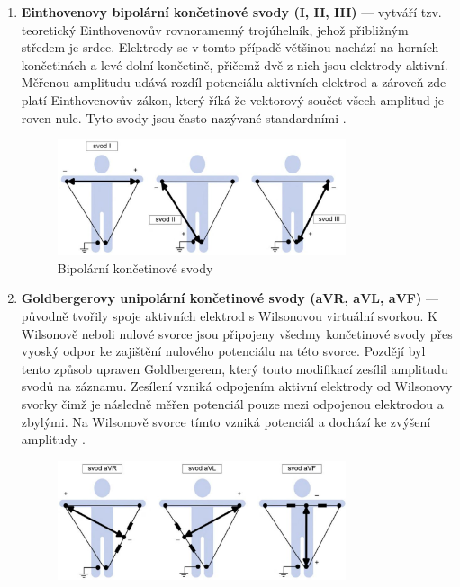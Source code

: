 \begin{enumerate}
	\item \textbf{Einthovenovy bipolární končetinové svody (I, II, III)} ---
	      vytváří tzv. teoretický Einthovenovův rovnoramenný trojúhelník, jehož
	      přibližným středem je srdce. Elektrody se v tomto případě většinou
	      nachází na horních končetinách a levé dolní končetině, přičemž dvě z
	      nich jsou elektrody aktivní. Měřenou amplitudu udává rozdíl
	      potenciálu aktivních elektrod a zároveň zde platí Einthovenovův
	      zákon, který říká že vektorový součet všech amplitud je roven nule.
	      Tyto svody jsou často nazývané standardními \cite{Kittnar2020}.
	      \begin{figure}[h]
		      \begin{center}
			      \includegraphics[width=0.8\textwidth]{../assets/anatomy/bipolar}
			      \caption{Bipolární končetinové svody \cite{Kittnar2020}}
			      \label{fig:bipolar}
		      \end{center}
	      \end{figure}
	\item \textbf{Goldbergerovy unipolární končetinové svody (aVR, aVL, aVF)}
	      --- původně tvořily spoje aktivních elektrod s Wilsonovou virtuální
	      svorkou. K Wilsonově neboli nulové svorce jsou připojeny všechny
	      končetinové svody přes vyoský odpor ke zajištění nulového potenciálu
	      na této svorce. Pozdějí byl tento způsob upraven Goldbergerem, který
	      touto modifikací zesílil amplitudu svodů na záznamu. Zesílení vzniká
	      odpojením aktivní elektrody od Wilsonovy svorky čimž je následně měřen
	      potenciál pouze mezi odpojenou elektrodou a zbylými. Na Wilsonově
	      svorce tímto vzniká potenciál a dochází ke zvýšení amplitudy
	      \cite{Kittnar2020}.
	      \begin{figure}[h]
		      \begin{center}
			      \includegraphics[width=0.8\textwidth]{../assets/anatomy/unipolar1}

\end{center}
\end{figure}
\end{enumerate}
